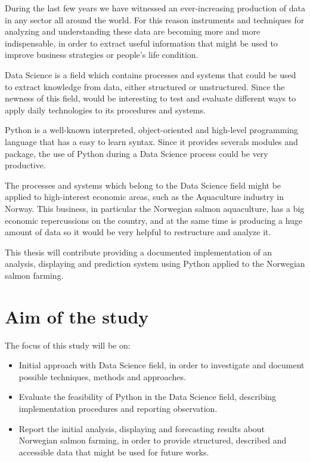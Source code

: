 

During the last few years we have witnessed an ever-increasing production of data in any sector all around the world.
For this reason instruments and techniques for analyzing and understanding these data are becoming more and more indispensable, in order to extract useful information that might be used to improve business strategies or people's life condition.

Data Science is a field which contains processes and systems that could be used to extract knowledge from data, either structured or unstructured. Since the newness of this field, would be interesting to test and evaluate different ways to apply daily technologies to its procedures and systems.

Python is a well-known interpreted, object-oriented and high-level programming language that has a easy to learn syntax.
Since it provides severals modules and package, the use of Python during a Data Science process could be very productive.

The processes and systems which belong to the Data Science field might be applied to high-interest  economic areas, such as the Aquaculture industry in Norway.
This business, in particular the Norwegian salmon aquaculture, has a big economic repercussions on the country, and at the same time is producing a huge amount of data so it would be very helpful to restructure and analyze it.

This thesis will contribute providing a documented implementation of an analysis, displaying and prediction system using Python applied to the Norwegian salmon farming.

\newpage

\section{Aim of the study}
\vspace{-5mm}
The focus of this study will be on:
\begin{itemize} 
 \item Initial approach with Data Science field, in order to investigate and document possible techniques, methods and approaches.
 
 \item Evaluate the feasibility of Python in the Data Science field, describing implementation procedures and reporting observation. 
  
 \item Report the initial analysis, displaying and forecasting results about Norwegian salmon farming, in order to provide structured, described and accessible data that might be used for future works.


\end{itemize}

